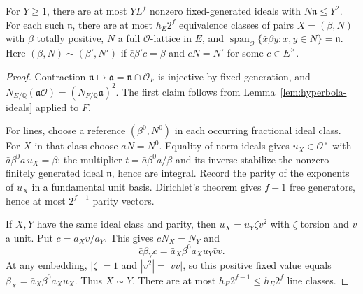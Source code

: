 \begin{lemma}\label{lem:real-lines}
For $Y\geq1$, there are at most $YL^f$ nonzero fixed-generated ideals with
$N\mathfrak n\leq Y^2$. For each such $\mathfrak n$, there are at most
$h_E2^f$ equivalence classes of pairs $X=(\beta,N)$ with $\beta$ totally
positive, $N$ a full $\mathcal O$-lattice in $E$, and
$\operatorname{span}_{\mathcal O}\{\bar x\beta y:x,y\in N\}
=\mathfrak n$. Here $(\beta,N)\sim(\beta',N')$ if
$\bar c\beta'c=\beta$ and $cN=N'$ for some $c\in E^\times$.
\end{lemma}
\begin{proof}
Contraction $\mathfrak n\mapsto\mathfrak a=\mathfrak n\cap\mathcal O_F$ is
injective by fixed-generation, and
$N_{E/\mathbb Q}(\mathfrak a\mathcal O)=(N_{F/\mathbb Q}\mathfrak a)^2$.
The first claim follows from Lemma~\ref{lem:hyperbola-ideals} applied to $F$.

For lines, choose a reference $(\beta^0,N^0)$ in each occurring fractional
ideal class. For $X$ in that class choose $aN=N^0$. Equality of norm ideals
gives $u_X\in\mathcal O^\times$ with $\bar a\beta^0a\,u_X=\beta$: the multiplier
$t=\bar a\beta^0a/\beta$ and its inverse stabilize the nonzero finitely
generated ideal $\mathfrak n$, hence are integral. Record the parity of the
exponents of $u_X$ in a fundamental unit basis. Dirichlet's theorem gives
$f-1$ free generators, hence at most $2^{f-1}$ parity vectors.

If $X,Y$ have the same ideal class and parity, then $u_X=u_Y\zeta v^2$ with
$\zeta$ torsion and $v$ a unit. Put $c=a_Xv/a_Y$. This gives $cN_X=N_Y$ and
\[
\bar c\beta_Yc=\bar a_X\beta^0a_Xu_Y\bar v v.
\]
At any embedding, $|\zeta|=1$ and $|v^2|=|\bar v v|$, so this positive fixed
value equals $\beta_X=\bar a_X\beta^0a_Xu_X$. Thus $X\sim Y$. There are at
most $h_E2^{f-1}\leq h_E2^f$ line classes.
\end{proof}

